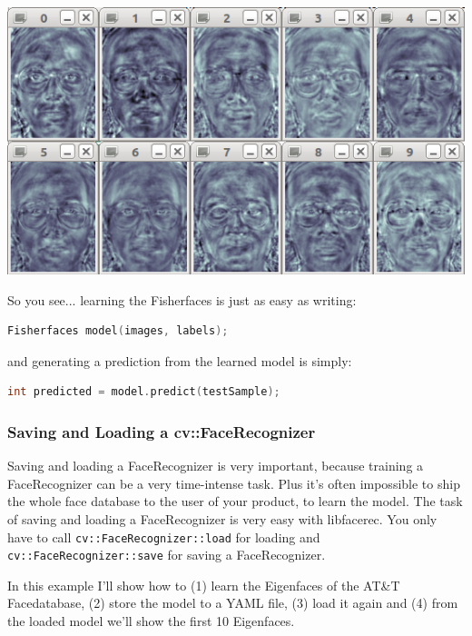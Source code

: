 \begin{center}
	\includegraphics[scale=0.60]{img/libfacerec/fisherfaces_yale_a.png}
\end{center}

So you see... learning the Fisherfaces is just as easy as writing:

\begin{lstlisting}[language=c++]
Fisherfaces model(images, labels);
\end{lstlisting}

and generating a prediction from the learned model is simply:

\begin{lstlisting}[language=c++]
int predicted = model.predict(testSample);
\end{lstlisting}

\subsubsection{Saving and Loading a cv::FaceRecognizer}

Saving and loading a FaceRecognizer is very important, because training a FaceRecognizer can be a very time-intense task. Plus it’s often impossible to ship the whole face database to the user of your product, to learn the model. The task of saving and loading a FaceRecognizer is very easy with libfacerec. You only have to call \lstinline|cv::FaceRecognizer::load| for loading and \lstinline|cv::FaceRecognizer::save| for saving a FaceRecognizer.

In this example I'll show how to (1) learn the Eigenfaces of the AT\&T Facedatabase, (2) store the model to a YAML file, (3) load it again and (4) from the loaded model we’ll show the first 10 Eigenfaces.

